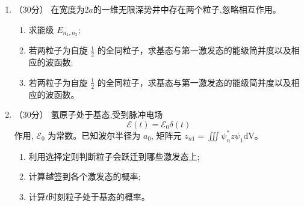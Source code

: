 \begin{enumerate}
\begin{enumerate}
\end{enumerate}

\banswer{
	
}



\newpage
\item 
（30分）
在宽度为$ 2a $的一维无限深势井中存在两个粒子,忽略相互作用。
\begin{enumerate}
	\item
	求能级 $E_{n_{1}, n_{2}}$;
	\item
	若两粒子为自旋 $\frac{1}{2}$ 的全同粒子，求基态与第一激发态的能级简并度以及相应的波函数;
	\item
	若两粒子为自旋 $\frac{1}{2}$ 的全同粒子，求基态与第一激发态的能级简并度以及相应的波函数。
	
	
	
\end{enumerate}
\banswer{
	
}



\item 
（30分）
氢原子处于基态,受到脉冲电场
$$
\mathscr{E}(t)=\mathscr{E}_{0} \delta(t)
$$
作用, $\mathscr{E}_{0}$ 为常数。已知波尔半径为 $a_{0}$, 矩阵元 $z_{n 1}=\iiint \psi_{n}^{*} z \psi_{1} \mathrm{dV}$。
\begin{enumerate}
	\item
利用选择定则判断粒子会跃迁到哪些激发态上;
	
	
	\item
	计算越签到各个激发态的概率;
	
	
	\item
	计算$ t $时刻粒子处于基态的概率。
	
	
	
	
	
	
\end{enumerate}


\banswer{
	
}


	
\end{enumerate}


